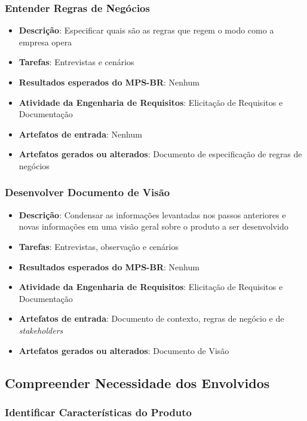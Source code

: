 \subsubsection{Entender Regras de Negócios}

\begin{itemize}
\item \textbf{Descrição}: Especificar quais são as regras que regem o modo como a empresa opera
\item \textbf{Tarefas}: Entrevistas e cenários
\item \textbf{Resultados esperados do MPS-BR}: Nenhum
\item \textbf{Atividade da Engenharia de Requisitos}: Elicitação de Requisitos e Documentação
\item \textbf{Artefatos de entrada}: Nenhum
\item \textbf{Artefatos gerados ou alterados}: Documento de especificação de regras de negócios
\end{itemize}

\subsubsection{Desenvolver Documento de Visão}

\begin{itemize}
\item \textbf{Descrição}: Condensar as informações levantadas nos passos anteriores e novas informações em uma visão geral sobre o produto a ser desenvolvido
\item \textbf{Tarefas}: Entrevistas, observação e cenários
\item \textbf{Resultados esperados do MPS-BR}: Nenhum
\item \textbf{Atividade da Engenharia de Requisitos}: Elicitação de Requisitos e Documentação
\item \textbf{Artefatos de entrada}: Documento de contexto, regras de negócio e de \textit{stakeholders}
\item \textbf{Artefatos gerados ou alterados}: Documento de Visão
\end{itemize}

\subsection{Compreender Necessidade dos Envolvidos}

\subsubsection{Identificar Características do Produto}

